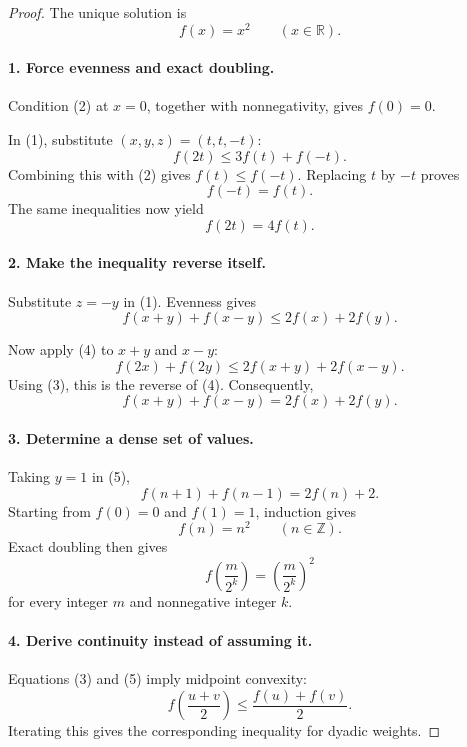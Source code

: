 
\begin{dlsummary}[title={\bfseries Solution 47. The Three-Variable Quadratic Trap},breakable]

\begin{proof}
The unique solution is
\[
\boxed{f(x)=x^2\qquad(x\in\mathbb R).}
\]

\paragraph{1. Force evenness and exact doubling.}

Condition (2) at \(x=0\), together with nonnegativity, gives \(f(0)=0\).

In (1), substitute \((x,y,z)=(t,t,-t)\):
\[
f(2t)\le3f(t)+f(-t).
\]
Combining this with (2) gives \(f(t)\le f(-t)\). Replacing \(t\) by \(-t\) proves
\[
f(-t)=f(t).
\]
The same inequalities now yield
\[
\boxed{f(2t)=4f(t).} \tag{3}
\]

\paragraph{2. Make the inequality reverse itself.}

Substitute \(z=-y\) in (1). Evenness gives
\[
f(x+y)+f(x-y)\le2f(x)+2f(y). \tag{4}
\]

Now apply (4) to \(x+y\) and \(x-y\):
\[
f(2x)+f(2y)\le2f(x+y)+2f(x-y).
\]
Using (3), this is the reverse of (4). Consequently,
\[
\boxed{f(x+y)+f(x-y)=2f(x)+2f(y).} \tag{5}
\]

\paragraph{3. Determine a dense set of values.}

Taking \(y=1\) in (5),
\[
f(n+1)+f(n-1)=2f(n)+2.
\]
Starting from \(f(0)=0\) and \(f(1)=1\), induction gives
\[
f(n)=n^2\qquad(n\in\mathbb Z).
\]
Exact doubling then gives
\[
f\!\left(\frac{m}{2^k}\right)=\left(\frac{m}{2^k}\right)^2
\]
for every integer \(m\) and nonnegative integer \(k\).

\paragraph{4. Derive continuity instead of assuming it.}

Equations (3) and (5) imply midpoint convexity:
\[
f\!\left(\frac{u+v}{2}\right)
\le\frac{f(u)+f(v)}2.
\]
Iterating this gives the corresponding inequality for dyadic weights.


\end{proof}
\end{dlsummary}
